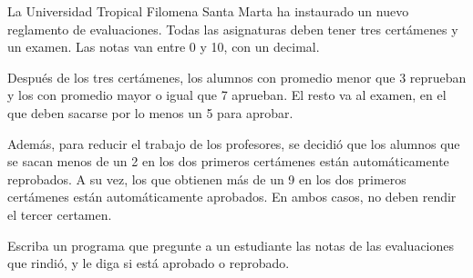 La Universidad Tropical Filomena Santa Marta
ha instaurado un nuevo reglamento de evaluaciones.
Todas las asignaturas deben tener tres certámenes y un examen.
Las notas van entre 0 y 10, con un decimal.

Después de los tres certámenes,
los alumnos con promedio menor que 3 reprueban y
los con promedio mayor o igual que 7 aprueban.
El resto va al examen,
en el que deben sacarse por lo menos un 5 para aprobar.

Además,
para reducir el trabajo de los profesores,
se decidió que los alumnos que se sacan menos de un 2
en los dos primeros certámenes
están automáticamente reprobados.
A su vez,
los que obtienen más de un 9
en los dos primeros certámenes
están automáticamente aprobados.
En ambos casos,
no deben rendir el tercer certamen.

Escriba un programa que pregunte a un estudiante
las notas de las evaluaciones que rindió,
y le diga si está aprobado o reprobado.

\begin{minipage}[t]{.2\textwidth}
  
\end{minipage}
\hfil
\begin{minipage}[t]{.2\textwidth}
  
\end{minipage}
\hfil
\begin{minipage}[t]{.2\textwidth}
  
\end{minipage}
%  
%  
\hfil
\begin{minipage}[t]{.2\textwidth}
  
\end{minipage}

